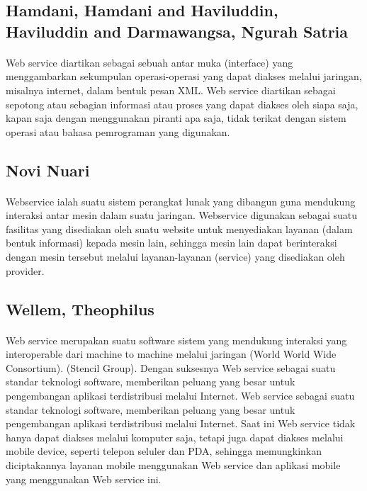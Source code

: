 \documentclass[12pt]{article}
\begin{document}
\subsection{Hamdani, Hamdani and Haviluddin, Haviluddin and Darmawangsa, Ngurah Satria}
\paragraph{}
Web service diartikan sebagai sebuah antar muka (interface) yang menggambarkan sekumpulan operasi-operasi yang dapat diakses melalui jaringan, misalnya internet, dalam bentuk pesan XML. Web service diartikan sebagai sepotong atau sebagian informasi atau proses yang dapat diakses oleh siapa saja, kapan saja dengan menggunakan piranti apa saja, tidak terikat dengan sistem operasi atau bahasa pemrograman yang digunakan.

\subsection{Novi Nuari}
\paragraph{}
Webservice ialah suatu sistem perangkat lunak yang dibangun guna mendukung interaksi antar mesin dalam suatu jaringan. Webservice digunakan sebagai suatu fasilitas yang disediakan oleh suatu website untuk menyediakan layanan (dalam bentuk informasi) kepada mesin lain, sehingga mesin lain dapat berinteraksi dengan mesin tersebut melalui layanan-layanan (service) yang disediakan oleh provider\cite{nuari2014perancangan}.

\subsection{Wellem, Theophilus}
\paragraph{}
Web service merupakan suatu software sistem yang mendukung interaksi yang interoperable dari machine to machine melalui jaringan (World World Wide Consortium).  (Stencil Group). Dengan suksesnya Web service sebagai suatu standar teknologi software, memberikan peluang yang besar untuk pengembangan aplikasi terdistribusi melalui Internet.
Web service sebagai suatu standar teknologi software, memberikan peluang yang besar untuk pengembangan aplikasi terdistribusi melalui Internet. Saat ini Web service tidak hanya dapat diakses melalui komputer saja, tetapi juga dapat diakses melalui mobile device, seperti telepon seluler dan PDA, sehingga memungkinkan diciptakannya layanan mobile menggunakan Web service dan aplikasi mobile yang menggunakan Web service ini\cite{wellem2015perancangan}.
\end{document}
